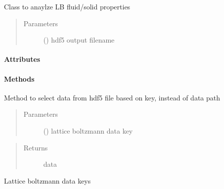 \documentclass[letterpaper,10pt,english]{sphinxmanual}
\begin{document}
\begin{fulllineitems}
\label{\detokenize{index:lb_colloids.Colloids.Colloid_output.LBOutput}}
Class to anaylze LB fluid/solid properties
\begin{quote}\begin{description}
\item[{Parameters}] \leavevmode
{} () \textendash{} hdf5 output filename

\end{description}\end{quote}
\paragraph{Attributes}
\paragraph{Methods}

\begin{fulllineitems}
\label{\detokenize{index:lb_colloids.Colloids.Colloid_output.LBOutput.get_data}}
Method to select data from hdf5 file based on key, instead
of data path
\begin{quote}\begin{description}
\item[{Parameters}] \leavevmode
{} () \textendash{} lattice boltzmann data key

\end{description}\end{quote}
\begin{quote}\begin{description}
\item[{Returns}] \leavevmode
data

\end{description}\end{quote}

\end{fulllineitems}


\begin{fulllineitems}
\label{\detokenize{index:lb_colloids.Colloids.Colloid_output.LBOutput.keys}}
 \textendash{} Lattice boltzmann data keys

\end{fulllineitems}


\end{fulllineitems}
\end{document}
